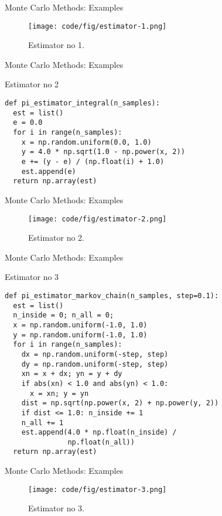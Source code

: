 \documentclass[10pt]{beamer}
\begin{document}
\begin{frame}[fragile]{Monte Carlo Methods: Examples}
\begin{figure}
  \texttt{[image: code/fig/estimator-1.png]}
  \caption{Estimator no 1.}
\end{figure}
\end{frame}

\begin{frame}[fragile]{Monte Carlo Methods: Examples}
\begin{block}{Estimator no 2}
\begin{lstlisting}
def pi_estimator_integral(n_samples):
  est = list()
  e = 0.0
  for i in range(n_samples):
    x = np.random.uniform(0.0, 1.0)
    y = 4.0 * np.sqrt(1.0 - np.power(x, 2))
    e += (y - e) / (np.float(i) + 1.0)
    est.append(e)
  return np.array(est)
\end{lstlisting}
\end{block}
\end{frame}

\begin{frame}[fragile]{Monte Carlo Methods: Examples}
\begin{figure}
  \texttt{[image: code/fig/estimator-2.png]}
  \caption{Estimator no 2.}
\end{figure}
\end{frame}

\begin{frame}[fragile]{Monte Carlo Methods: Examples}
\begin{block}{Estimator no 3}
\begin{lstlisting}
def pi_estimator_markov_chain(n_samples, step=0.1):
  est = list()
  n_inside = 0; n_all = 0;
  x = np.random.uniform(-1.0, 1.0)
  y = np.random.uniform(-1.0, 1.0)
  for i in range(n_samples):
    dx = np.random.uniform(-step, step)
    dy = np.random.uniform(-step, step)
    xn = x + dx; yn = y + dy
    if abs(xn) < 1.0 and abs(yn) < 1.0:
      x = xn; y = yn
    dist = np.sqrt(np.power(x, 2) + np.power(y, 2))
    if dist <= 1.0: n_inside += 1
    n_all += 1
    est.append(4.0 * np.float(n_inside) /
               np.float(n_all))
  return np.array(est)
\end{lstlisting}
\end{block}
\end{frame}

\begin{frame}[fragile]{Monte Carlo Methods: Examples}
\begin{figure}
  \texttt{[image: code/fig/estimator-3.png]}
  \caption{Estimator no 3.}
\end{figure}
\end{frame}
\end{document}
